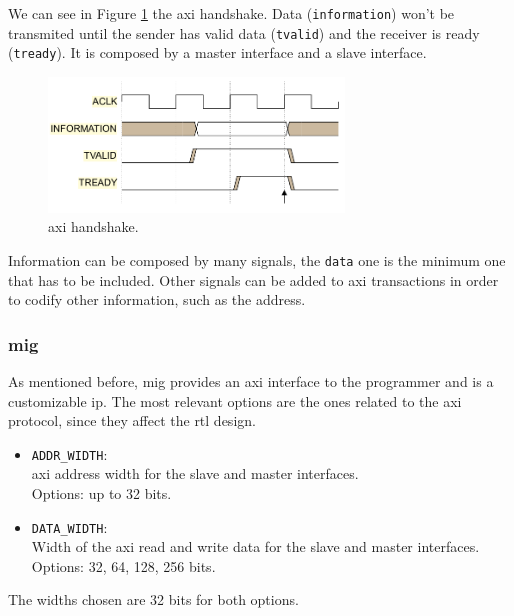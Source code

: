 We can see in Figure \ref{fig:axi} the \gls{axi} handshake. %
Data (\texttt{information}) won't be transmited until the sender has valid data (\texttt{tvalid}) and the receiver is ready (\texttt{tready}).
It is composed by a master interface and a slave interface.

\begin{figure}
    \centering
    \includegraphics[width=0.7\textwidth]{images/axi.png}
    \caption{\gls{axi} handshake.}
    \label{fig:axi}
\end{figure}

Information can be composed by many signals, the \texttt{data} one is the minimum one that has to be included.
Other signals can be added to \gls{axi} transactions in order to codify other information, such as the address.

\subsubsection{\acrshort{mig}}
As mentioned before, \gls{mig} provides an \gls{axi} interface to the programmer and is a customizable \gls{ip}. 
The most relevant options are the ones related to the \gls{axi} protocol, since they affect the \gls{rtl} design.
\begin{itemize}
    \item \texttt{ADDR\_WIDTH}: \\
        \gls{axi} address width for the slave and master interfaces. \\
        Options: up to 32 bits.
        
    \item \texttt{DATA\_WIDTH}: \\
        Width of the \gls{axi} read and write data for the slave and master interfaces. \\
        Options: 32, 64, 128, 256 bits.
\end{itemize}

The widths chosen are 32 bits for both options.

